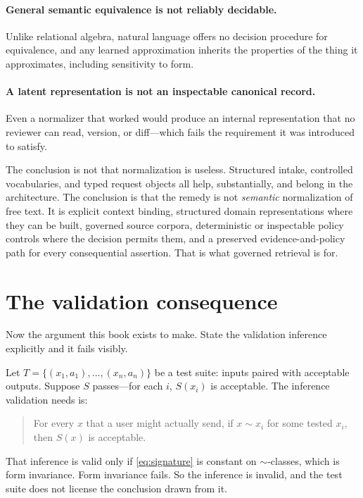 \paragraph{General semantic equivalence is not reliably decidable.} Unlike
relational algebra, natural language offers no decision procedure for equivalence,
and any learned approximation inherits the properties of the thing it approximates,
including sensitivity to form.

\paragraph{A latent representation is not an inspectable canonical record.} Even a
normalizer that worked would produce an internal representation that no reviewer
can read, version, or diff---which fails the requirement it was introduced to
satisfy.

The conclusion is not that normalization is useless. Structured intake, controlled
vocabularies, and typed request objects all help, substantially, and belong in the
architecture. The conclusion is that the remedy is not \emph{semantic}
normalization of free text. It is explicit context binding, structured domain
representations where they can be built, governed source corpora, deterministic or
inspectable policy controls where the decision permits them, and a preserved
evidence-and-policy path for every consequential assertion. That is what governed
retrieval is for.

\section{The validation consequence}
\label{sec:validation-consequence}

Now the argument this book exists to make. State the validation inference
explicitly and it fails visibly.

Let $T = \{(x_1, a_1), \ldots, (x_n, a_n)\}$ be a test suite: inputs paired with
acceptable outputs. Suppose $S$ passes---for each $i$, $S(x_i)$ is acceptable. The
inference validation needs is:

\begin{quote}
For every $x$ that a user might actually send, if $x \sim x_i$ for some tested
$x_i$, then $S(x)$ is acceptable.
\end{quote}

That inference is valid only if \eqref{eq:signature} is constant on $\sim$-classes,
which is form
invariance. Form invariance fails. So the inference is invalid, and the test suite
does not license the conclusion drawn from it.

